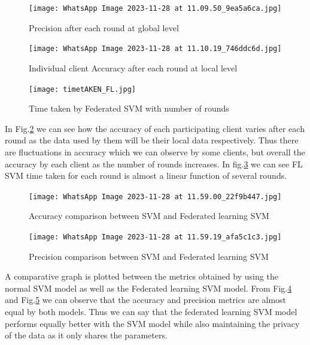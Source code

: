\documentclass[conference]{IEEEtran}
\begin{document}


\begin{figure}[htp]
    \centering
    \texttt{[image: WhatsApp Image 2023-11-28 at 11.09.50\_9ea5a6ca.jpg]}
    \caption{Precision after each round at global level}
    \label{di4}
\end{figure}

\begin{figure}[htp]
    \centering
    \texttt{[image: WhatsApp Image 2023-11-28 at 11.10.19\_746ddc6d.jpg]}
    \caption{Individual client Accuracy after each round at local level}
    \label{di5}
\end{figure}

\begin{figure}[htp]
    \centering
    \texttt{[image: timetAKEN\_FL.jpg]}
    \caption{Time taken by Federated SVM with number of rounds}
    \label{di8}
\end{figure}

In Fig.\ref{di5} we can see how the accuracy of each participating client 
varies after each round as the data used by them will be their local data respectively. Thus there are fluctuations in accuracy which we can observe by some clients, but overall the accuracy by each client as the number of rounds increases.
In fig.\ref{di8} we can see FL SVM time taken for each round is almost a linear function of several rounds.

\begin{figure}[htp]
    \centering
    \texttt{[image: WhatsApp Image 2023-11-28 at 11.59.00\_22f9b447.jpg]}
    \caption{Accuracy comparison between SVM and Federated learning SVM}
    \label{di6}
\end{figure}

\begin{figure}[htp]
    \centering
    \texttt{[image: WhatsApp Image 2023-11-28 at 11.59.19\_afa5c1c3.jpg]}
    
    \caption{Precision comparison between SVM and Federated learning SVM}
    \label{di7}
\end{figure}


A comparative graph is plotted between the metrics obtained by using the normal SVM model as well as the Federated learning SVM model. From Fig.\ref{di6} and Fig.\ref{di7} we can observe that the accuracy and precision metrics are almost equal by both models. Thus we can say that the federated learning SVM model performs equally better with the SVM model while also maintaining the privacy of the data as it only shares the parameters.
\end{document}
